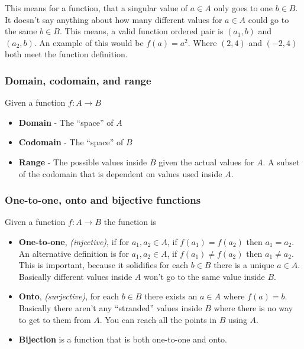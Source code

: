 \documentclass{article}
\begin{document}
This means for a function, that a singular value of $a \in A$ only goes to one $b \in B$. It doesn't say anything about how many different values for $a \in A$ could go to the same $b \in B$. This means, a valid function ordered pair is $(a_1, b)$ and $(a_2, b)$. An example of this would be $f(a) = a^2$. Where $(2, 4)$ and $(-2, 4)$ both meet the function definition.

\subsubsection{Domain, codomain, and range}

Given a function $f: A \rightarrow B$

\begin{itemize}
    \item \textbf{Domain} - The ``space'' of $A$
    \item \textbf{Codomain} - The ``space'' of $B$
    \item \textbf{Range} - The possible values inside $B$ given the actual values for $A$. A subset of the codomain that is dependent on values used inside $A$.
\end{itemize}

\subsubsection{One-to-one, onto and bijective functions}

Given a function $f: A \rightarrow B$ the function is

\begin{itemize}
    \item \textbf{One-to-one}, \textit{(injective)}, if for $a_1, a_2 \in A$, if $f(a_1) = f(a_2)$ then $a_1 = a_2$. An alternative definition is for $a_1, a_2 \in A$, if $f(a_1) \neq f(a_2)$ then $a_1 \neq a_2$. This is important, because it solidifies for each $b \in B$ there is a unique $a \in A$. Basically different values inside $A$ won't go to the same value inside $B$.
    \item \textbf{Onto}, \textit{(surjective)}, for each $b \in B$ there exists an $a \in A$ where $f(a) = b$. Basically there aren't any ``stranded'' values inside $B$ where there is no way to get to them from $A$. You can reach all the points in $B$ using $A$.
    \item \textbf{Bijection} is a function that is both one-to-one and onto.
\end{itemize}
\end{document}

